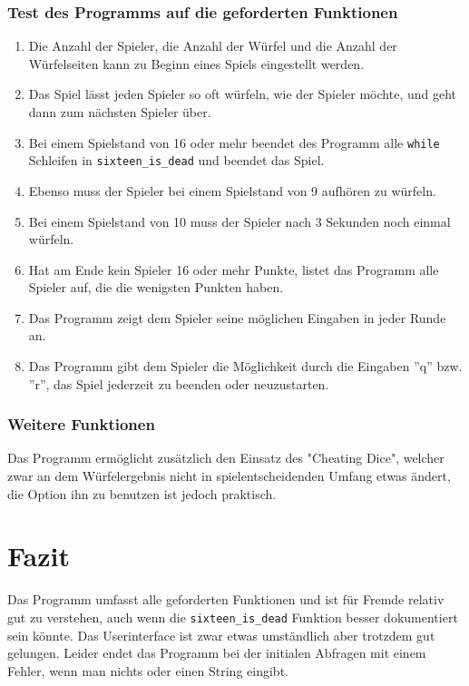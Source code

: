 \subsubsection*{Test des Programms auf die geforderten Funktionen}
\begin{enumerate}
\item Die Anzahl der Spieler, die Anzahl der Würfel und die Anzahl der Würfelseiten kann zu Beginn eines Spiels eingestellt werden.
\item Das Spiel lässt jeden Spieler so oft würfeln, wie der Spieler möchte, und geht dann zum nächsten Spieler über.
\item Bei einem Spielstand von 16 oder mehr beendet des Programm alle \verb+while+ Schleifen in \verb+sixteen_is_dead+ und beendet das Spiel.
\item Ebenso muss der Spieler bei einem Spielstand von 9 aufhören zu würfeln.
\item Bei einem Spielstand von 10 muss der Spieler nach 3 Sekunden noch einmal würfeln.
\item Hat am Ende kein Spieler 16 oder mehr Punkte, listet das Programm alle Spieler auf, die die wenigsten Punkten haben.
\item Das Programm zeigt dem Spieler seine möglichen Eingaben in jeder Runde an.
\item Das Programm gibt dem Spieler die Möglichkeit durch die Eingaben ''q'' bzw. ''r'', das Spiel jederzeit zu beenden oder neuzustarten.
\end{enumerate}

\subsubsection*{Weitere Funktionen}

Das Programm ermöglicht zusätzlich den Einsatz des "Cheating Dice", welcher zwar an dem Würfelergebnis nicht in spielentscheidenden Umfang etwas ändert, die Option ihn zu benutzen ist jedoch praktisch.

\section*{Fazit}
Das Programm umfasst alle geforderten Funktionen und ist für Fremde relativ gut zu verstehen, auch wenn die \verb+sixteen_is_dead+ Funktion besser dokumentiert sein könnte.
Das Userinterface ist zwar etwas umständlich aber trotzdem gut gelungen. Leider endet das Programm bei der initialen Abfragen mit einem Fehler, wenn man nichts oder einen String eingibt.